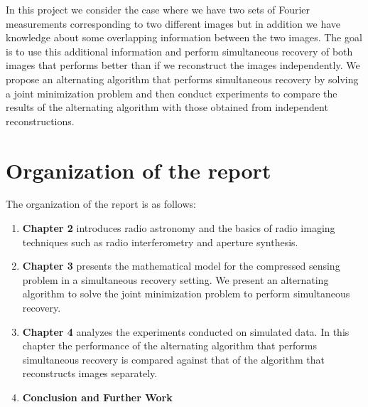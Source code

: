 In this project we consider the case where we have two sets of Fourier measurements corresponding to two different images but in addition we have knowledge about some overlapping information between the two images. The goal is to use this additional information and perform  simultaneous recovery of both images that performs better than if we reconstruct the images independently.  We propose an alternating algorithm that performs simultaneous recovery by solving a joint minimization problem and then conduct experiments to compare the results of the alternating algorithm with those obtained from independent reconstructions. 



\section*{Organization of the report}
The organization of the report is as follows:
\begin{enumerate}
\item \textbf{Chapter 2} introduces radio astronomy and the basics of radio imaging techniques such as radio interferometry and aperture synthesis.
\item \textbf{Chapter 3} presents the mathematical model for the compressed sensing problem in a simultaneous recovery setting. We present an alternating algorithm to solve the joint minimization problem to perform simultaneous recovery.

\item \textbf{Chapter 4} analyzes the experiments conducted on simulated data. In this chapter the performance of the alternating algorithm that performs simultaneous recovery is compared against that of the algorithm that reconstructs images separately.

\item \textbf{Conclusion and Further Work}
\end{enumerate}


